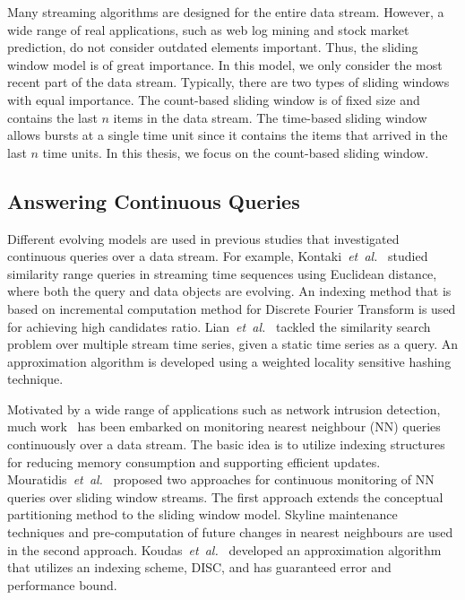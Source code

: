 Many streaming algorithms are designed for the entire data stream. However, a wide range of real applications, such as web log mining and stock market prediction, do not consider outdated elements important. Thus, the sliding window model is of great importance. In this model, we only consider the most recent part of the data stream. Typically, there are two types of sliding windows with equal importance. The count-based sliding window is of fixed size and contains the last $n$ items in the data stream. The time-based sliding window allows bursts at a single time unit since it contains the items that arrived in the last $n$ time units. In this thesis, we focus on the count-based sliding window.   

\subsection{Answering Continuous Queries}

Different evolving models are used in previous studies that investigated continuous queries over a data stream. For example, Kontaki~\textit{et~al.}~\cite{KP04} studied similarity range queries in streaming time sequences using Euclidean distance, where both the query and data objects are evolving. An indexing method that is based on incremental computation method for Discrete Fourier Transform is used for achieving high candidates ratio. Lian~\textit{et~al.}~\cite{DBLP:conf/dasfaa/LianCW07} tackled the similarity search problem over multiple stream time series, given a static time series as a query. An approximation algorithm is developed using a weighted locality sensitive hashing technique. 

Motivated by a wide range of applications such as network intrusion detection, much work~\cite{DBLP:conf/icde/BohmOPY07, DBLP:conf/vldb/KoudasOT004, DBLP:journals/tkde/MouratidisP07, DBLP:journals/tkde/MouratidisPBT05} has been embarked on monitoring nearest neighbour (NN) queries continuously over a data stream. The basic idea is to utilize indexing structures for reducing memory consumption and supporting efficient updates. Mouratidis~\textit{et~al.}~\cite{DBLP:journals/tkde/MouratidisP07} proposed two approaches for continuous monitoring of NN queries over sliding window streams.  The first approach extends the conceptual partitioning method to the sliding window model. Skyline maintenance techniques and pre-computation of future changes in nearest neighbours are used in the second approach.  Koudas~\textit{et~al.}~\cite{DBLP:conf/vldb/KoudasOT004} developed an approximation algorithm that utilizes an indexing scheme, DISC, and has guaranteed error and performance bound.


